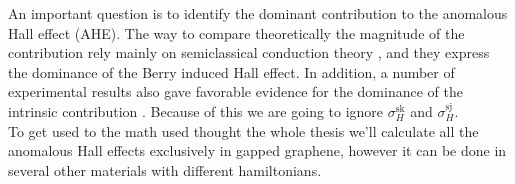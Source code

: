 An important question is to identify the dominant contribution to the anomalous Hall effect (AHE). The way to compare theoretically the magnitude of the contribution rely mainly on semiclassical conduction theory \cite{dugaev2005anomalous}, and they express the dominance of the Berry induced Hall effect. In addition, a number of experimental results also gave favorable evidence for the dominance of the intrinsic contribution \cite{tian2009proper}. Because of this we are going to ignore $\sigma_H^\textrm{sk}$ and $\sigma_H^\textrm{sj}$.\\
To get used to the math used thought the whole thesis we'll calculate all the anomalous Hall effects exclusively in gapped graphene, however it can be done in several other materials with different hamiltonians.












